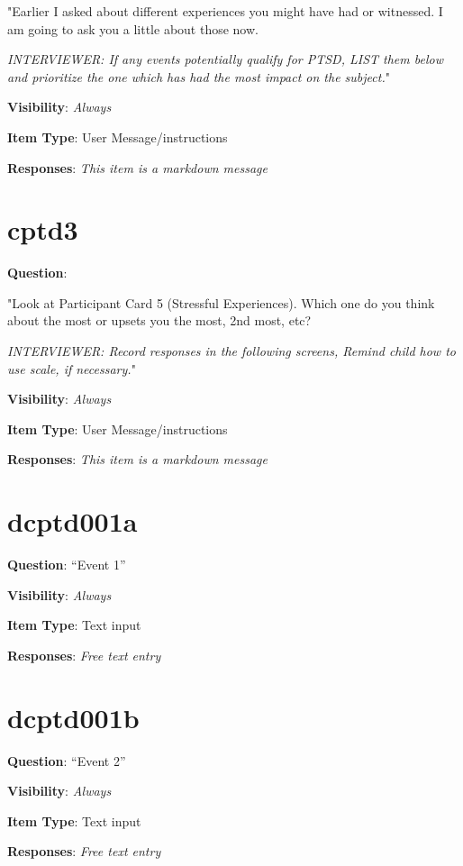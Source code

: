 \documentclass[]{book}
\begin{document}
"Earlier I asked about different experiences you might have had or witnessed. I am going to ask you a little about those now.

\emph{INTERVIEWER: If any events potentially qualify for PTSD, LIST them below and prioritize the one which has had the most impact on the subject.}"

\textbf{Visibility}: \emph{Always}

\textbf{Item Type}: User Message/instructions

\textbf{Responses}: \emph{This item is a markdown message}

\hypertarget{cptd3}{%
\section{cptd3}\label{cptd3}}

\textbf{Question}:

"Look at Participant Card 5 (Stressful Experiences). Which one do you think about the most or upsets you the most, 2nd most, etc?

\emph{INTERVIEWER: Record responses in the following screens, Remind child how to use scale, if necessary.}"

\textbf{Visibility}: \emph{Always}

\textbf{Item Type}: User Message/instructions

\textbf{Responses}: \emph{This item is a markdown message}

\hypertarget{dcptd001a}{%
\section{dcptd001a}\label{dcptd001a}}

\textbf{Question}: ``Event 1''

\textbf{Visibility}: \emph{Always}

\textbf{Item Type}: Text input

\textbf{Responses}: \emph{Free text entry}

\hypertarget{dcptd001b}{%
\section{dcptd001b}\label{dcptd001b}}

\textbf{Question}: ``Event 2''

\textbf{Visibility}: \emph{Always}

\textbf{Item Type}: Text input

\textbf{Responses}: \emph{Free text entry}
\end{document}

